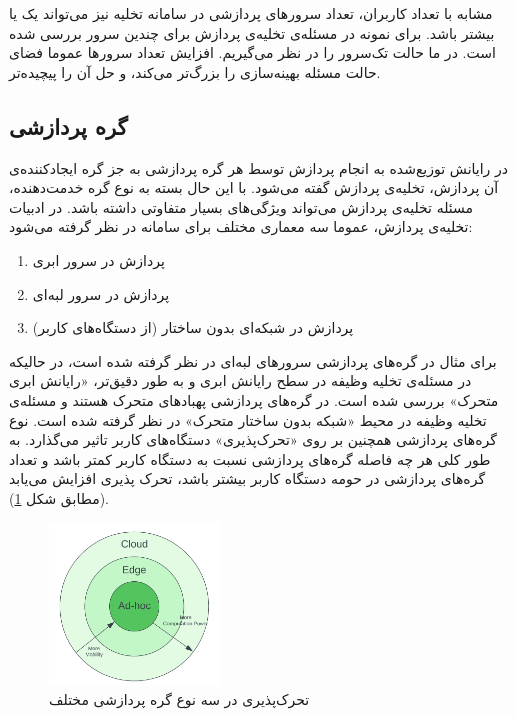 مشابه با تعداد کاربران، تعداد سرورهای پردازشی در سامانه تخلیه نیز می‌تواند یک یا بیشتر باشد. برای نمونه در \Cite{multiuser} مسئله‌ی تخلیه‌ی پردازش برای چندین سرور بررسی شده است. در \CurrentProject ما حالت تک‌سرور را در نظر می‌گیریم. افزایش تعداد سرورها عموما فضای حالت مسئله بهینه‌سازی را بزرگ‌تر می‌کند، و حل آن را پیچیده‌تر.

\subsection{گره پردازشی}
در رایانش توزیع‌شده به انجام پردازش توسط هر گره پردازشی به جز گره ایجادکننده‌ی آن پردازش، تخلیه‌ی پردازش گفته می‌شود. با این حال بسته به نوع گره خدمت‌دهنده، مسئله تخلیه‌ی پردازش می‌تواند ویژگی‌های بسیار متفاوتی داشته باشد. در ادبیات تخلیه‌ی پردازش، عموما سه معماری مختلف برای سامانه در نظر گرفته می‌شود:
\begin{enumerate}
	\item پردازش در سرور ابری
	\item پردازش در سرور لبه‌ای
	\item پردازش در شبکه‌ای بدون ساختار (از دستگاه‌های کاربر)
\end{enumerate}
برای مثال در \Cite{Liu} گره‌های پردازشی سرورهای لبه‌ای در نظر گرفته شده است، در حالیکه در \Cite{kwak} مسئله‌ی تخلیه وظیفه در سطح رایانش ابری و به طور دقیق‌تر، «رایانش ابری متحرک» بررسی شده است. در \Cite{manet} گره‌های پردازشی پهبادهای متحرک هستند و مسئله‌ی تخلیه وظیفه در محیط «شبکه بدون ساختار متحرک» در نظر گرفته شده است. نوع گره‌های پردازشی همچنین بر روی «تحرک‌پذیری» دستگاه‌های کاربر تاثیر می‌گذارد. به طور کلی هر چه فاصله گره‌های پردازشی نسبت به دستگاه کاربر کمتر باشد و تعداد گره‌های پردازشی در حومه دستگاه کاربر بیشتر باشد، تحرک پذیری افزایش می‌یابد (مطابق شکل \ref{fig:mobility}).
\begin{figure}[H]
	\centering
	\includegraphics[width=0.4\textwidth]{figures/mobility.png}
	\caption{تحرک‌پذیری در سه نوع گره پردازشی مختلف}
	\label{fig:mobility}
\end{figure}

